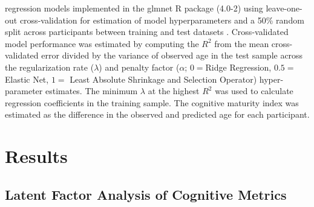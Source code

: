\documentclass{article}%
\begin{document}
regression models implemented in the glmnet R package (4.0-2) using leave-one-out cross-validation for estimation of model hyperparameters and a 50\% random split across participants between training and test datasets \citep{FriedmanHastieTibshirani2010, friedman2009glmnet}. Cross-validated model performance was estimated by computing the $R^2$ from the mean cross-validated error divided by the variance of observed age in the test sample across the regularization rate ($\lambda$) and penalty factor ($\alpha$; $0 = $Ridge Regression, $0.5 = $ Elastic Net, $1 =$ Least Absolute Shrinkage and Selection Operator) hyper-parameter estimates. The minimum $\lambda$ at the highest $R^2$ was used to calculate regression coefficients in the training sample. The cognitive maturity index was estimated as the difference in the observed and predicted age for each participant. 
\section*{Results} 
\subsection*{Latent Factor Analysis of Cognitive Metrics} 
\end{document}
